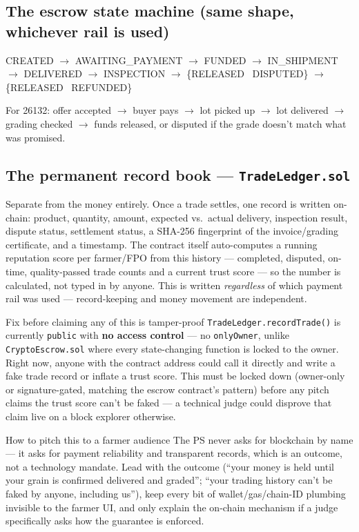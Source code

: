 \documentclass[11pt]{article}
\begin{document}
\subsection*{The escrow state machine (same shape, whichever rail is used)}
\begin{center}
\small
CREATED $\to$ AWAITING\_PAYMENT $\to$ FUNDED $\to$ IN\_SHIPMENT $\to$ DELIVERED $\to$ INSPECTION $\to$
\{RELEASED \textbar\ DISPUTED\} $\to$ \{RELEASED \textbar\ REFUNDED\}
\end{center}
For 26132: offer accepted $\to$ buyer pays $\to$ lot picked up $\to$ lot delivered $\to$ grading checked
$\to$ funds released, or disputed if the grade doesn't match what was promised.

\subsection*{The permanent record book --- \texttt{TradeLedger.sol}}
Separate from the money entirely. Once a trade settles, one record is written on-chain: product, quantity,
amount, expected vs.\ actual delivery, inspection result, dispute status, settlement status, a SHA-256
fingerprint of the invoice/grading certificate, and a timestamp. The contract itself auto-computes a
running reputation score per farmer/FPO from this history --- completed, disputed, on-time, quality-passed
trade counts and a current trust score --- so the number is calculated, not typed in by anyone. This is
written \emph{regardless} of which payment rail was used --- record-keeping and money movement are
independent.

\begin{redbox}{Fix before claiming any of this is tamper-proof}
\texttt{TradeLedger.recordTrade()} is currently \texttt{public} with \textbf{no access control} --- no
\texttt{onlyOwner}, unlike \texttt{CryptoEscrow.sol} where every state-changing function is locked to the
owner. Right now, anyone with the contract address could call it directly and write a fake trade record or
inflate a trust score. This must be locked down (owner-only or signature-gated, matching the escrow
contract's pattern) before any pitch claims the trust score can't be faked --- a technical judge could
disprove that claim live on a block explorer otherwise.
\end{redbox}

\begin{uspbox}{How to pitch this to a farmer audience}
The PS never asks for blockchain by name --- it asks for payment reliability and transparent records, which
is an outcome, not a technology mandate. Lead with the outcome (``your money is held until your grain is
confirmed delivered and graded''; ``your trading history can't be faked by anyone, including us''), keep
every bit of wallet/gas/chain-ID plumbing invisible to the farmer UI, and only explain the on-chain
mechanism if a judge specifically asks how the guarantee is enforced.
\end{uspbox}
\end{document}
